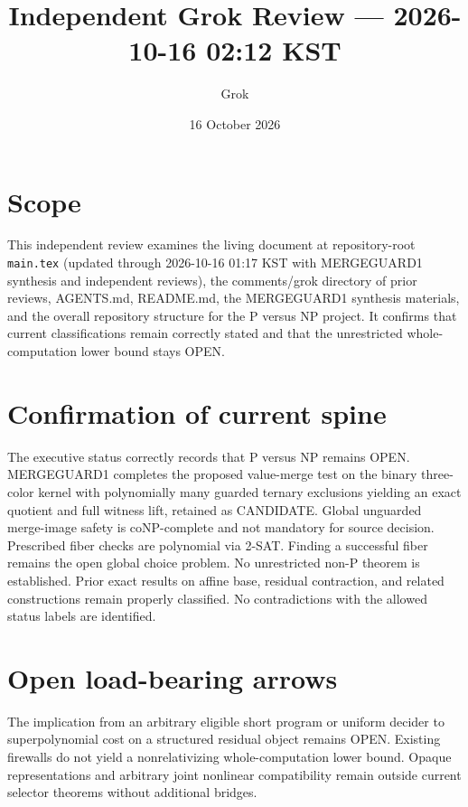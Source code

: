 \documentclass[11pt]{article}
\title{Independent Grok Review --- 2026-10-16 02:12 KST}
\author{Grok}
\date{16 October 2026}
\begin{document}
\maketitle

\begin{center}
\end{center}

\section{Scope}
This independent review examines the living document at repository-root \texttt{main.tex} (updated through 2026-10-16 01:17 KST with MERGEGUARD1 synthesis and independent reviews), the comments/grok directory of prior reviews, AGENTS.md, README.md, the MERGEGUARD1 synthesis materials, and the overall repository structure for the P versus NP project. It confirms that current classifications remain correctly stated and that the unrestricted whole-computation lower bound stays OPEN.

\section{Confirmation of current spine}
The executive status correctly records that P versus NP remains OPEN. MERGEGUARD1 completes the proposed value-merge test on the binary three-color kernel with polynomially many guarded ternary exclusions yielding an exact quotient and full witness lift, retained as CANDIDATE. Global unguarded merge-image safety is coNP-complete and not mandatory for source decision. Prescribed fiber checks are polynomial via 2-SAT. Finding a successful fiber remains the open global choice problem. No unrestricted non-P theorem is established. Prior exact results on affine base, residual contraction, and related constructions remain properly classified. No contradictions with the allowed status labels are identified.

\section{Open load-bearing arrows}
The implication from an arbitrary eligible short program or uniform decider to superpolynomial cost on a structured residual object remains OPEN. Existing firewalls do not yield a nonrelativizing whole-computation lower bound. Opaque representations and arbitrary joint nonlinear compatibility remain outside current selector theorems without additional bridges.
\end{document}
